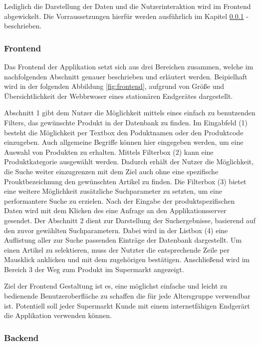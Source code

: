 Lediglich die Darstellung der Daten und die Nutzerinteraktion wird im Frontend abgewickelt.
Die Vorraussetzungen hierfür werden ausführlich im Kapitel \ref{sec:frontend} -  beschrieben.

\subsubsection{Frontend}
\label{sec:frontend}
Das Frontend der Applikation setzt sich aus drei Bereichen zusammen, welche im nachfolgenden Abschnitt genauer beschrieben und erläutert werden.
Beipielhaft wird in der folgenden Abbildung \ref{fig:frontend}, aufgrund von Größe und Übersichtlichkeit der Webbrwoser eines stationären 
Endgerätes dargestellt.

Abschnitt 1 gibt dem Nutzer die Möglichkeit mittels eines einfach zu benutzenden Filters, das gewünschte Produkt in der Datenbank zu finden.
Im Eingabfeld (1) besteht die Möglichkeit per Textbox den Poduktnamen oder den Produktcode einzugeben. Auch allgemeine Begriffe können hier
eingegeben werden, um eine Auswahl von Produkten zu erhalten. Mittels Filterbox (2) kann eine Produktkategorie ausgewählt werden. Dadurch erhält 
der Nutzer die Möglichkeit, die Suche weiter einzugrenzen mit dem Ziel auch ohne eine spezifische Prouktbezeichnung den gewünschten Artikel 
zu finden. Die Filterbox (3) bietet eine weitere Möglichkeit zusätzliche Suchparameter zu setzten, um eine performantere Suche zu erzielen.
Nach der Eingabe der produktspezifischen Daten wird mit dem Klicken des  eine Anfrage an den Applikationsserver gesendet. 
Der Abschnitt 2 dient zur Darstellung der Suchergebnisse, basierend auf den zuvor gewählten Suchparametern. Dabei wird in der Listbox (4) 
eine Auflistung aller zur Suche passenden Einträge der Datenbank dargestellt. Um einen Artikel zu selektieren, muss der Nutzter die entsprechende
Zeile per Mausklick anklicken und mit dem zugehörigen  bestätigen. Anschließend wird im Bereich 3 der Weg zum Produkt im Supermarkt
angezeigt.


Ziel der Frontend Gestaltung ist es, eine möglichst einfache und leicht zu bedienende Benutzeroberfläche zu schaffen die für jede Altersgruppe 
verwendbar ist. Potentiell soll jeder Supermarkt Kunde mit einem internetfähigen Endgerärt die Applikation verwenden können. 


\subsubsection{Backend}
\label{sec:backend}

